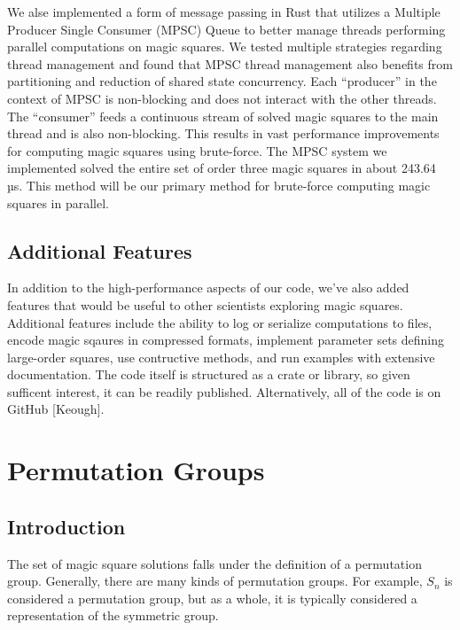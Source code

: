 \documentclass[12pt]{report}
\begin{document}
\par We alse implemented a form of message passing in Rust that utilizes a Multiple Producer Single
Consumer (MPSC) Queue to better manage threads performing parallel computations on magic squares.
We tested multiple strategies regarding thread management and found that MPSC thread management
also benefits from partitioning and reduction of shared state concurrency. Each ``producer'' in the
context of MPSC is non-blocking and does not interact with the other threads. The ``consumer''
feeds a continuous stream of solved magic squares to the main thread and is also non-blocking. This
results in vast performance improvements for computing magic squares using brute-force. The MPSC
system we implemented solved the entire set of order three magic squares in about 243.64 µs. This
method will be our primary method for brute-force computing magic squares in parallel.

\section{Additional Features}

\par In addition to the high-performance aspects of our code, we've also added features that would
be useful to other scientists exploring magic squares. Additional features include the ability to
log or serialize computations to files, encode magic sqaures in compressed formats, implement
parameter sets defining large-order squares, use contructive methods, and run examples with
extensive documentation. The code itself is structured as a crate or library, so given sufficent
interest, it can be readily published. Alternatively, all of the code is on GitHub [Keough].

\chapter{Permutation Groups}

\section{Introduction}

\par The set of magic square solutions falls under the definition of a permutation group.
Generally, there are many kinds of permutation groups. For example, $S_n$ is considered a
permutation group, but as a whole, it is typically considered a representation of the symmetric
group.
\end{document}
